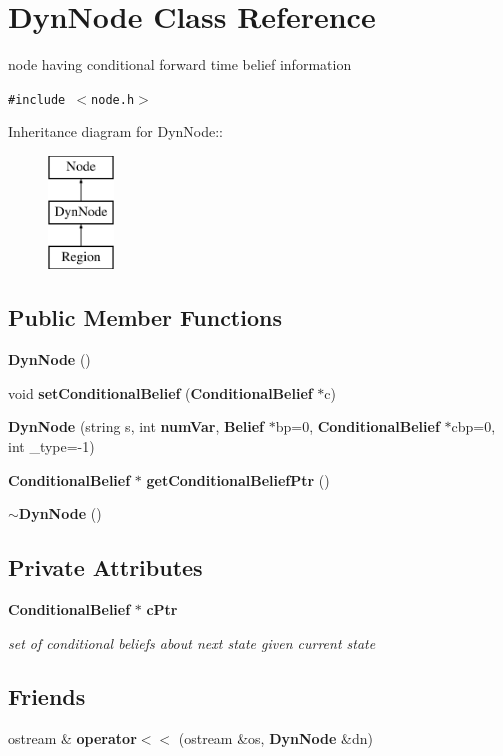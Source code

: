 \section{DynNode Class Reference}
\label{classDynNode}
node having conditional forward time belief information  


{\tt \#include $<$node.h$>$}

Inheritance diagram for DynNode::\begin{figure}[H]
\begin{center}
\leavevmode
\includegraphics[height=3cm]{classDynNode}
\end{center}
\end{figure}
\subsection*{Public Member Functions}
\begin{CompactItemize}
\item 
{\bf DynNode} ()
\item 
void {\bf setConditionalBelief} ({\bf ConditionalBelief} $\ast$c)
\item 
{\bf DynNode} (string s, int {\bf numVar}, {\bf Belief} $\ast$bp=0, {\bf ConditionalBelief} $\ast$cbp=0, int \_\-type=-1)
\item 
{\bf ConditionalBelief} $\ast$ {\bf getConditionalBeliefPtr} ()
\item 
{\bf $\sim$DynNode} ()
\end{CompactItemize}
\subsection*{Private Attributes}
\begin{CompactItemize}
\item 
{\bf ConditionalBelief} $\ast$ {\bf cPtr}
\begin{CompactList}\small\item\em set of conditional beliefs about next state given current state \item\end{CompactList}\end{CompactItemize}
\subsection*{Friends}
\begin{CompactItemize}
\item 
ostream \& {\bf operator$<$$<$} (ostream \&os, {\bf DynNode} \&dn)
\end{CompactItemize}


